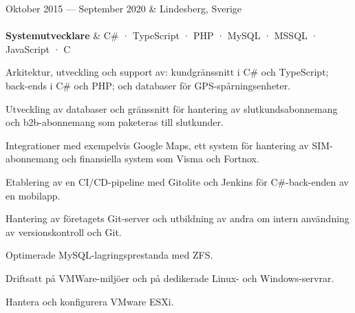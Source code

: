 \documentclass{cv-stylish}
\begin{document}
\begin{center}
\vspace{1em}
\begin{JobTable}
  Oktober 2015 --- September 2020 & \hfill Lindesberg, Sverige \\[3pt]
   \\[3pt]
  \hspace{5mm} \textbf{Systemutvecklare}
  & \hfill C\# · TypeScript · PHP · MySQL · MSSQL · JavaScript · C \\
\end{JobTable}
\begin{adjustwidth}{0.015\linewidth}{0.015\linewidth}

\begin{compactitem}
  \item Arkitektur, utveckling och support av: kundgränssnitt i
    C\# och TypeScript; back-ends i C\# och PHP; och databaser för
    GPS-spårningsenheter.
  \item Utveckling av databaser och gränssnitt för hantering av
    slutkundsabonnemang och b2b-abonnemang som paketeras till slutkunder.
  \item Integrationer med exempelvis Google Maps, ett system för hantering
    av SIM-abonnemang och finansiella system som Visma och Fortnox.
  \item Etablering av en CI/CD-pipeline med Gitolite och Jenkins för C\#-back-enden av en mobilapp.
  \item Hantering av företagets Git-server och utbildning av andra om
    intern användning av versionskontroll och Git.
  \item Optimerade MySQL-lagringsprestanda med ZFS.
  \item Driftsatt på VMWare-miljöer och på dedikerade Linux- och
    Windows-servrar.
  \item Hantera och konfigurera VMware ESXi.
\end{compactitem}
\end{adjustwidth}


\end{center}
\end{document}
